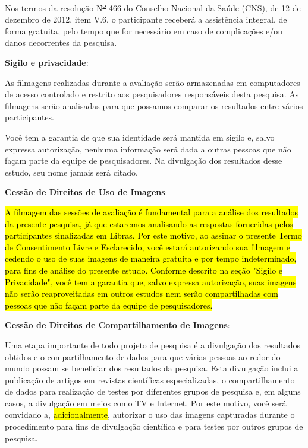 \documentclass[a4paper, 12pt]{article}
\begin{document}
Nos termos da resolução N\textsuperscript{\underline{o}} 466 do Conselho Nacional da Saúde (CNS), de 12 de dezembro de 2012, item V.6, o participante receberá a assistência integral, de forma gratuita, pelo tempo que for necessário em caso de complicações e/ou danos decorrentes da pesquisa.

\vspace{10pt}
\textbf{Sigilo e privacidade}:

As filmagens realizadas durante a avaliação serão armazenadas em computadores de acesso controlado e restrito aos pesquisadores responsáveis desta pesquisa. As filmagens serão analisadas para que possamos comparar os resultados entre vários participantes.

Você tem a garantia de que sua identidade será mantida em sigilo e, salvo expressa autorização, nenhuma informação será dada a outras pessoas que não façam parte da equipe de pesquisadores. Na divulgação dos resultados desse estudo, seu nome jamais será citado.



\vspace{10pt}
\textbf{Cessão de Direitos de Uso de Imagens}:

\hl{A filmagem das sessões de avaliação é fundamental para a análise dos resultados da presente pesquisa, já que estaremos analisando as respostas fornecidas pelos participantes sinalizadas em Libras. Por este motivo, ao assinar o presente Termo de Consentimento Livre e Esclarecido, você estará autorizando sua filmagem e cedendo o uso de suas imagens de maneira gratuita e por tempo indeterminado, para fins de análise do presente estudo. Conforme descrito na seção "Sigilo e Privacidade", você tem a garantia que, salvo expressa autorização, suas imagens não serão reaproveitadas em outros estudos nem serão compartilhadas com pessoas que não façam parte da equipe de pesquisadores.}





\vspace{10pt}
\textbf{Cessão de Direitos de Compartilhamento de Imagens}:

Uma etapa importante de todo projeto de pesquisa é a divulgação dos resultados obtidos e o compartilhamento de dados para que várias pessoas ao redor do mundo possam se beneficiar dos resultados da pesquisa. Esta divulgação inclui a publicação de artigos em revistas científicas especializadas, o compartilhamento de dados para realização de testes por diferentes grupos de pesquisa e, em alguns casos, a divulgação em meios como TV e Internet.
Por este motivo, você será convidado a, \hl{adicionalmente}, autorizar o uso das imagens capturadas durante o procedimento para fins de divulgação científica e para testes por outros grupos de pesquisa.
\end{document}
